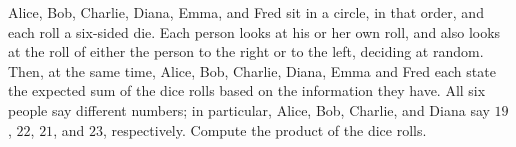 Alice, Bob, Charlie, Diana, Emma, and Fred sit in a circle, in that order, and each roll a six-sided die. Each person looks at his or her own roll, and also looks at the roll of either the person to the right or to the left, deciding at random. Then, at the same time, Alice, Bob, Charlie, Diana, Emma and Fred each state the expected sum of the dice rolls based on the information they have. All six people say different numbers; in particular, Alice, Bob, Charlie, and Diana say $19$, $22$, $21$, and $23$, respectively. Compute the product of the dice rolls.